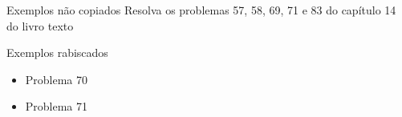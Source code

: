 \begin{frame}{Exemplos não copiados}
    Resolva os problemas 57, 58, 69, 71 e 83 do capítulo 14 do livro texto
\end{frame}

\begin{frame}{Exemplos rabiscados}
\begin{itemize}
    \item Problema 70
    \item Problema 71
\end{itemize}
\end{frame}




